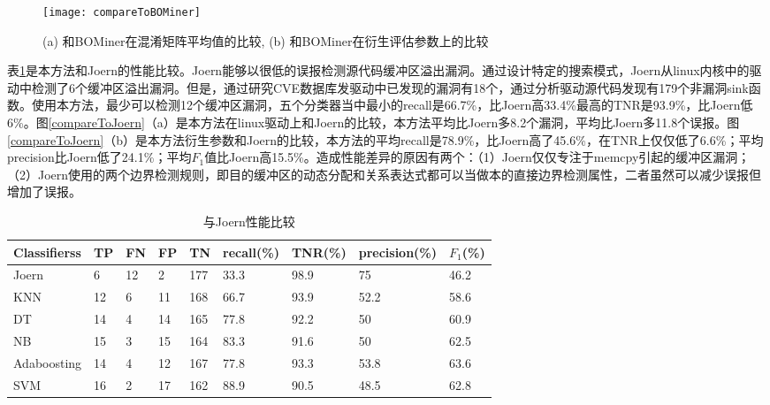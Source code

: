 {\begin{figure}[htb]
\begin{center}
\texttt{[image: compareToBOMiner]}
\end{center}
\caption{(a) 和BOMiner在混淆矩阵平均值的比较, (b) 和BOMiner在衍生评估参数上的比较}
\label{compareToBOMiner}
\end{figure}

表\ref{和Joern的混淆矩阵比较}是本方法和Joern的性能比较。Joern能够以很低的误报检测源代码缓冲区溢出漏洞。通过设计特定的搜索模式，Joern从linux内核中的驱动中检测了6个缓冲区溢出漏洞。但是，通过研究CVE数据库发驱动中已发现的漏洞有18个，通过分析驱动源代码发现有179个非漏洞sink函数。使用本方法，最少可以检测12个缓冲区漏洞，五个分类器当中最小的recall是66.7\%，比Joern高33.4\%最高的TNR是93.9\%，比Joern低6\%。图\ref{compareToJoern}（a）是本方法在linux驱动上和Joern的比较，本方法平均比Joern多8.2个漏洞，平均比Joern多11.8个误报。图\ref{compareToJoern}（b）是本方法衍生参数和Joern的比较，本方法的平均recall是78.9\%，比Joern高了45.6\%，在TNR上仅仅低了6.6\%；平均precision比Joern低了24.1\%；平均$F_1$值比Joern高15.5\%。造成性能差异的原因有两个：（1）Joern仅仅专注于memcpy引起的缓冲区漏洞；（2）Joern使用的两个边界检测规则，即目的缓冲区的动态分配和关系表达式都可以当做本的直接边界检测属性，二者虽然可以减少误报但增加了误报。

\begin{table}[ht]
\begin{center}
\caption{与Joern性能比较} \label{和Joern的混淆矩阵比较}
\begin{small}
\begin{tabular}{lllllllll}
\hline
 {\bf Classifierss}& {\bf TP} & {\bf FN} & {\bf FP} & {\bf TN} & {\bf recall(\%)} & {\bf TNR(\%)} & {\bf precision(\%)} & {\bf $F_1$(\%)}\\ \hline
Joern & 6 & 12 & 2 & 177 & 33.3 & 98.9 & 75 & 46.2\\ \hline
KNN & 12 & 6 & 11 & 168 & 66.7 & 93.9 & 52.2 & 58.6\\ \hline
DT & 14 & 4 & 14 & 165 & 77.8 & 92.2 & 50 & 60.9\\ \hline
NB & 15 & 3 & 15 & 164 & 83.3 & 91.6 & 50 & 62.5\\ \hline
Adaboosting & 14 & 4 & 12 & 167 & 77.8 & 93.3 & 53.8 & 63.6\\ \hline
SVM & 16 & 2 & 17 & 162 & 88.9 & 90.5 & 48.5 & 62.8\\ \hline
\end{tabular}
\end{small}
\end{center}
\end{table}

}

